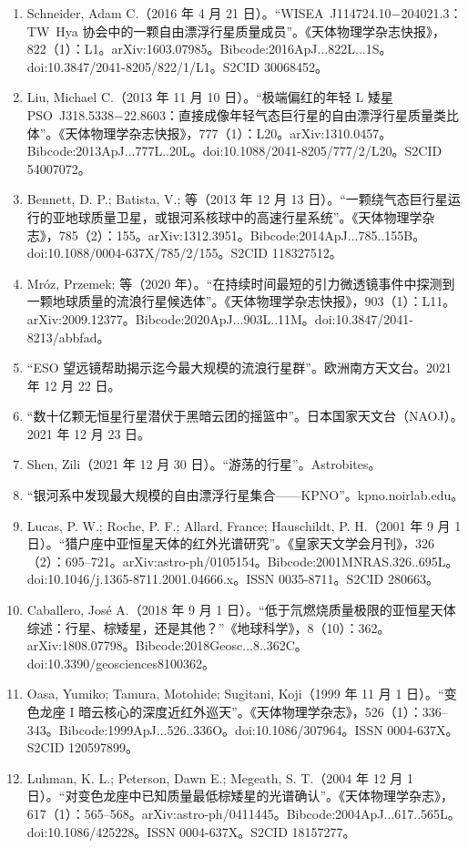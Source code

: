 \begin{enumerate}
\item Schneider, Adam C.（2016 年 4 月 21 日）。“WISEA~J114724.10$-$204021.3：TW~Hya 协会中的一颗自由漂浮行星质量成员”。《天体物理学杂志快报》，822（1）：L1。arXiv:1603.07985。Bibcode:2016ApJ...822L...1S。doi:10.3847/2041-8205/822/1/L1。S2CID 30068452。  
\item Liu, Michael C.（2013 年 11 月 10 日）。“极端偏红的年轻 L 矮星 PSO~J318.5338$-$22.8603：直接成像年轻气态巨行星的自由漂浮行星质量类比体”。《天体物理学杂志快报》，777（1）：L20。arXiv:1310.0457。Bibcode:2013ApJ...777L..20L。doi:10.1088/2041-8205/777/2/L20。S2CID 54007072。  
\item Bennett, D. P.; Batista, V.; 等（2013 年 12 月 13 日）。“一颗绕气态巨行星运行的亚地球质量卫星，或银河系核球中的高速行星系统”。《天体物理学杂志》，785（2）：155。arXiv:1312.3951。Bibcode:2014ApJ...785..155B。doi:10.1088/0004-637X/785/2/155。S2CID 118327512。  
\item Mróz, Przemek; 等（2020 年）。“在持续时间最短的引力微透镜事件中探测到一颗地球质量的流浪行星候选体”。《天体物理学杂志快报》，903（1）：L11。arXiv:2009.12377。Bibcode:2020ApJ...903L..11M。doi:10.3847/2041-8213/abbfad。  
\item “ESO 望远镜帮助揭示迄今最大规模的流浪行星群”。欧洲南方天文台。2021 年 12 月 22 日。  
\item “数十亿颗无恒星行星潜伏于黑暗云团的摇篮中”。日本国家天文台（NAOJ）。2021 年 12 月 23 日。  
\item Shen, Zili（2021 年 12 月 30 日）。“游荡的行星”。Astrobites。  
\item “银河系中发现最大规模的自由漂浮行星集合——KPNO”。kpno.noirlab.edu。  
\item Lucas, P. W.; Roche, P. F.; Allard, France; Hauschildt, P. H.（2001 年 9 月 1 日）。“猎户座中亚恒星天体的红外光谱研究”。《皇家天文学会月刊》，326（2）：695--721。arXiv:astro-ph/0105154。Bibcode:2001MNRAS.326..695L。doi:10.1046/j.1365-8711.2001.04666.x。ISSN 0035-8711。S2CID 280663。  
\item Caballero, José A.（2018 年 9 月 1 日）。“低于氘燃烧质量极限的亚恒星天体综述：行星、棕矮星，还是其他？”《地球科学》，8（10）：362。arXiv:1808.07798。Bibcode:2018Geosc...8..362C。doi:10.3390/geosciences8100362。  
\item Oasa, Yumiko; Tamura, Motohide; Sugitani, Koji（1999 年 11 月 1 日）。“变色龙座 I 暗云核心的深度近红外巡天”。《天体物理学杂志》，526（1）：336--343。Bibcode:1999ApJ...526..336O。doi:10.1086/307964。ISSN 0004-637X。S2CID 120597899。  
\item Luhman, K. L.; Peterson, Dawn E.; Megeath, S. T.（2004 年 12 月 1 日）。“对变色龙座中已知质量最低棕矮星的光谱确认”。《天体物理学杂志》，617（1）：565--568。arXiv:astro-ph/0411445。Bibcode:2004ApJ...617..565L。doi:10.1086/425228。ISSN 0004-637X。S2CID 18157277。  

\end{enumerate}
